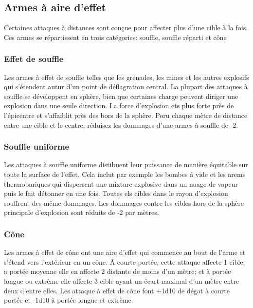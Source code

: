 \subsection{Armes à aire d'effet} \label{sec:area-effect-weapons} 

Certaines attaques à distances sont conçue pour affecter plus d'une cible à la fois. Ces armes se répartissent en trois catégories: souffle, souffle réparti et cône 

\subsubsection{Effet de souffle} 

Les armes à effet de souffle telles que les grenades, les mines et les autres explosifs qui s'étendent autur d'un point de déflagration central. La plupart des attaques à souffle se développent en sphère, bien que certaines charge peuvent diriger une explosion dans une seule direction. La force d'explosion ets plus forte près de l'épicentre et s'affaiblit près des bors de la sphère. Poru chaque mètre de distance entre une cible et le centre, réduisez les dommages d'une armes à souffle de -2. 

\subsubsection{Souffle uniforme} 

Les attaques à souffle uniforme distibuent leur puissance de manière équitable sur toute la surface de l'effet. Cela inclut par exemple les bombes à vide et les arems thermobariques qui dispersent une mixture explosive dans un nuage de vapeur puis le fait détonner en une fois. Toutes els cibles dans le rayon d'explosion souffrent des même dommages. Les dommages contre les cibles hors de la sphère principale d'explosion sont réduits de -2 par mètres. 

\subsubsection{Cône} 

Les armes à effet de cône ont une aire d'effet qui commence au bout de l'arme et s'étend vers l'extérieur en un cône. Â courte portée, cette attaque affecte 1 cible; a portée moyenne elle en affecte 2 distante de moins d'un mètre; et à portée longue ou extrême elle affecte 3 cible ayant un écart maximal d'un mètre entre deux d'entre elles. Les attaque à effet de cône font +1d10 de dégat à courte portée et -1d10 à portée longue et extrème. 



